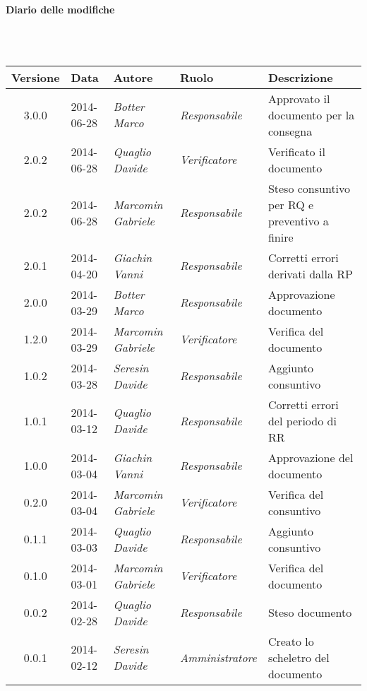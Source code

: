 \noindent\begin{Large}\textbf{Diario delle modifiche}\end{Large}\\
\\
\begin{small}
\begin{tabular}{|c|p{1.8cm}|p{2.8cm}|p{2.8cm}|p{3.5cm}|}
\hline
Versione & Data & Autore & Ruolo & Descrizione \\
\hline
\hline
3.0.0 & 2014-06-28 & 
\textit{Botter Marco} &
\textit{Responsabile} &  Approvato il documento per la consegna\\
\hline
\hline
2.0.2 & 2014-06-28 & 
\textit{Quaglio Davide} &
\textit{Verificatore} &  Verificato il documento\\
\hline
\hline
2.0.2 & 2014-06-28 & 
\textit{Marcomin Gabriele} &
\textit{Responsabile} &  Steso consuntivo per RQ e preventivo a finire\\
\hline
\hline
2.0.1 & 2014-04-20 & 
\textit{Giachin Vanni} &
\textit{Responsabile} &  Corretti errori derivati dalla RP\\
\hline
\hline
2.0.0 & 2014-03-29 & 
\textit{Botter Marco} &
\textit{Responsabile} &  Approvazione documento\\
\hline
1.2.0 & 2014-03-29 & 
\textit{Marcomin Gabriele} &
\textit{Verificatore} &  Verifica del documento\\
\hline
\hline
1.0.2 & 2014-03-28 & 
\textit{Seresin Davide} &
\textit{Responsabile} &  Aggiunto consuntivo\\
\hline
1.0.1 & 2014-03-12 & 
\textit{Quaglio Davide} &
\textit{Responsabile} &  Corretti errori del periodo di RR\\
\hline
1.0.0 & 2014-03-04 & 
\textit{Giachin Vanni} &
\textit{Responsabile} &  Approvazione del documento\\
\hline
0.2.0 & 2014-03-04 & 
\textit{Marcomin Gabriele} &
\textit{Verificatore} &  Verifica del consuntivo\\
\hline
0.1.1 & 2014-03-03 & 
\textit{Quaglio Davide} &
\textit{Responsabile} &  Aggiunto consuntivo\\
\hline
0.1.0 & 2014-03-01 & 
\textit{Marcomin Gabriele} &
\textit{Verificatore} &  Verifica del documento \\
\hline
0.0.2 & 2014-02-28 & 
\textit{Quaglio Davide} &
\textit{Responsabile} &  Steso documento\\
\hline
0.0.1 & 2014-02-12 & 
\textit{Seresin Davide} &
\textit{Amministratore} &  Creato lo scheletro del documento\\
\hline
\end{tabular}\\
\end{small}